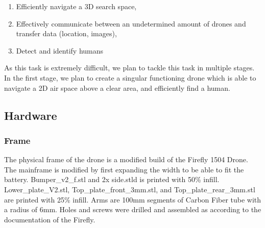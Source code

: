 \documentclass{article}
\begin{document}
\begin{enumerate}
  \item Efficiently navigate a 3D search space,
  \item Effectively communicate between an undetermined amount of drones and transfer data (location, images),
  \item Detect and identify humans
\end{enumerate}

As this task is extremely difficult, we plan to tackle this task in multiple stages. In the first stage, we plan to create a singular functioning drone which is able to navigate a 2D air space above a clear area, and efficiently find a human.

\subsection{Hardware}
\subsubsection{Frame}
The physical frame of the drone is a modified build of the Firefly 1504 Drone. The mainframe is modified by first expanding the width to be able to fit the battery. Bumper\_v2\_f.stl and 2x side.stld is printed with 50\% infill. Lower\_plate\_V2.stl, Top\_plate\_front\_3mm.stl, and Top\_plate\_rear\_3mm.stl are printed with 25\% infill. Arms are 100mm segments of Carbon Fiber tube with a radius of 6mm. Holes and screws were drilled and assembled as according to the documentation of the Firefly.
\end{document}
